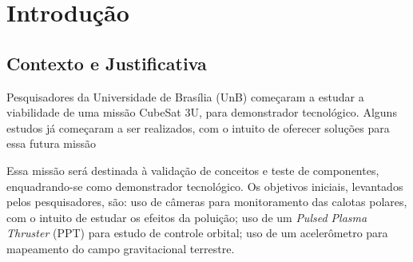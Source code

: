 



\chapter[Introdução]{Introdução}
\section{Contexto e Justificativa}
 
Pesquisadores da Universidade de Brasília (UnB) começaram a estudar a viabilidade de uma missão CubeSat 3U, para demonstrador tecnológico. Alguns estudos já começaram a ser realizados, com o intuito de oferecer soluções para essa futura missão

Essa missão será destinada à validação de conceitos e teste de componentes, enquadrando-se como demonstrador tecnológico. Os objetivos iniciais, levantados pelos pesquisadores, são: uso de câmeras para monitoramento das calotas polares, com o intuito de estudar os efeitos da poluição; uso de um \textit{Pulsed Plasma Thruster} (PPT) para estudo de controle orbital;  uso de um acelerômetro para mapeamento do campo gravitacional terrestre.

